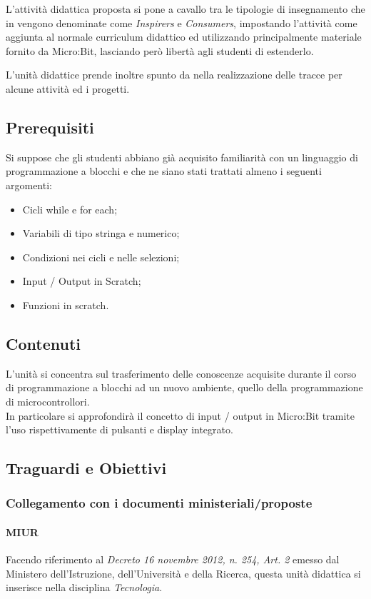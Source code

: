 \documentclass[../../relazione.tex]{subfiles}
\begin{document}
L'attività didattica proposta si pone a cavallo tra le tipologie di insegnamento che in \cite{10.1145/3137065.3137083} vengono denominate come \textit{Inspirers} e \textit{Consumers}, impostando l'attività come aggiunta al normale curriculum didattico ed utilizzando principalmente materiale fornito da Micro:Bit, lasciando però libertà agli studenti di estenderlo. 

L'unità didattice prende inoltre spunto da \cite{10.1145/3017680.3017749} nella realizzazione delle tracce per alcune attività ed i progetti.

\subsection{Prerequisiti}
Si suppose che gli studenti abbiano già acquisito familiarità con un linguaggio di programmazione a blocchi e che ne siano stati trattati almeno i seguenti argomenti:
\begin{itemize}
	\item Cicli while e for each;
	\item Variabili di tipo stringa e numerico;
	\item Condizioni nei cicli e nelle selezioni;
	\item Input / Output in Scratch;
	\item Funzioni in scratch.
\end{itemize}

\subsection{Contenuti}
L'unità si concentra sul trasferimento delle conoscenze acquisite durante il corso di programmazione a blocchi ad un nuovo ambiente, quello della programmazione di microcontrollori.\\
In particolare si approfondirà il concetto di input / output in Micro:Bit tramite l'uso rispettivamente di pulsanti e display integrato. 

\subsection{Traguardi e Obiettivi}

\subsubsection{Collegamento con i documenti ministeriali/proposte}
\paragraph{MIUR}
Facendo riferimento al \textit{Decreto 16 novembre 2012, n. 254, Art. 2} \cite{MIURWeb, MIUR254} emesso dal Ministero dell'Istruzione, dell'Università e della Ricerca, questa unità didattica si inserisce nella disciplina \textit{Tecnologia}.
\end{document}
